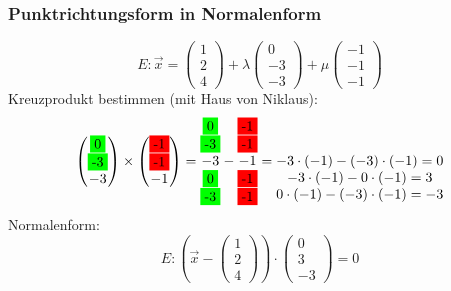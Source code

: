 \subsubsection{Punktrichtungsform in Normalenform}
\[
E: \vec{x} = 
  \begin{pmatrix}
    1 \\ 2 \\ 4
  \end{pmatrix} + \lambda
  \begin{pmatrix}
    0 \\ -3 \\ -3
  \end{pmatrix} + \mu
  \begin{pmatrix}
    -1 \\ -1 \\ -1
  \end{pmatrix} 
\]
Kreuzprodukt bestimmen (mit Haus von Niklaus):
\[
  \begin{pmatrix}
    \colorbox{green}{0} \\ \colorbox{green}{-3} \\ -3
  \end{pmatrix} \times
  \begin{pmatrix}
    \colorbox{red}{-1} \\ \colorbox{red}{-1} \\ -1
  \end{pmatrix} =  
  \begin{matrix}
    \colorbox{green}{0} \\ \colorbox{green}{-3} \\ -3 \\ \colorbox{green}{0} \\ \colorbox{green}{-3}
  \end{matrix} -
  \begin{matrix}
    \colorbox{red}{-1} \\ \colorbox{red}{-1} \\ -1 \\ \colorbox{red}{-1} \\ \colorbox{red}{-1}
  \end{matrix} =
  \begin{matrix}
    \\
    \\ -3 \cdot (-1) - (-3) \cdot (-1) = 0
    \\ -3 \cdot (-1) - 0 \cdot (-1) = 3
    \\ 0 \cdot (-1) - (-3) \cdot (-1) = -3
  \end{matrix}
\]
Normalenform:
\[
E: 
  (\vec{x} - 
  \begin{pmatrix}
    1 \\ 2 \\ 4
  \end{pmatrix}) \cdot 
  \begin{pmatrix}
    0 \\ 3 \\ -3
  \end{pmatrix} = 0 
\]

